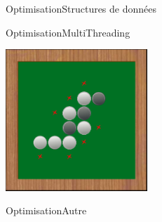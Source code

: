 \begin{frame}{Optimisation}{Structures de données}

\end{frame}

\begin{frame}{Optimisation}{MultiThreading}
\begin{center}
\includegraphics[width=0.4\textwidth]{img/screenshoot/multi-thread}
\end{center}
\end{frame}

\begin{frame}{Optimisation}{Autre}

\end{frame}
